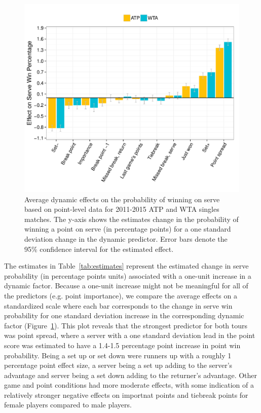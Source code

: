 \documentclass{Latex/svjour3}
\begin{document}
\begin{figure}
\includegraphics[scale=0.8]{figs/avg_effects.pdf}
\caption{Average dynamic effects on the probability of winning on
  serve based on point-level data for 2011-2015 ATP and WTA singles
  matches. The y-axis shows the estimates change in the probability of winning a
  point on serve (in percentage points) for a one standard deviation
  change in the dynamic predictor. Error bars denote the 95\%
  confidence interval for the estimated effect.}
\label{fig:1}
\end{figure}

The estimates in Table~\ref{tab:estimates} represent the estimated change in
serve probability (in percentage points units) associated with a one-unit
increase in a dynamic factor. Because a one-unit increase might not
be meaningful for all of the predictors (e.g. point importance), we
compare the average effects on a standardized scale where each bar
corresponds to the change in serve win probability for one standard
deviation increase in the corresponding dynamic factor
(Figure~\ref{fig:1}). This plot reveals that the strongest predictor
for both tours was point spread, where a server with a one standard
deviation lead in the point score was estimated to have a 1.4-1.5
percentage point increase in point win probability. Being a set up or set down were
runners up with a roughly 1 percentage point effect size, a server
being a set up
adding to the server's advantage and server being a set down adding to
the returner's advantage. Other game and point conditions
had more moderate effects, with some indication of a relatively stronger
negative effects on importnat points and tiebreak points for female
players compared to male players.
\end{document}
